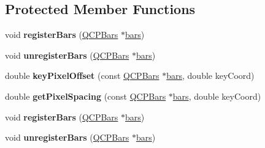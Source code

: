 \subsection*{Protected Member Functions}
\begin{DoxyCompactItemize}
\item 
void {\bfseries register\+Bars} (\hyperlink{class_q_c_p_bars}{Q\+C\+P\+Bars} $\ast$\hyperlink{class_q_c_p_bars_group_a7c72ed1f8cd962c93b8c42ab96cd91ec}{bars})\hypertarget{class_q_c_p_bars_group_a7b00514f19ad58d0bb3fd5246a67fae2}{}\label{class_q_c_p_bars_group_a7b00514f19ad58d0bb3fd5246a67fae2}

\item 
void {\bfseries unregister\+Bars} (\hyperlink{class_q_c_p_bars}{Q\+C\+P\+Bars} $\ast$\hyperlink{class_q_c_p_bars_group_a7c72ed1f8cd962c93b8c42ab96cd91ec}{bars})\hypertarget{class_q_c_p_bars_group_ac7073cdd7b1a40c6cb4b5f908145f8c4}{}\label{class_q_c_p_bars_group_ac7073cdd7b1a40c6cb4b5f908145f8c4}

\item 
double {\bfseries key\+Pixel\+Offset} (const \hyperlink{class_q_c_p_bars}{Q\+C\+P\+Bars} $\ast$\hyperlink{class_q_c_p_bars_group_a7c72ed1f8cd962c93b8c42ab96cd91ec}{bars}, double key\+Coord)\hypertarget{class_q_c_p_bars_group_a8e2ca6002e7bab49670144d048a2bcc9}{}\label{class_q_c_p_bars_group_a8e2ca6002e7bab49670144d048a2bcc9}

\item 
double {\bfseries get\+Pixel\+Spacing} (const \hyperlink{class_q_c_p_bars}{Q\+C\+P\+Bars} $\ast$\hyperlink{class_q_c_p_bars_group_a7c72ed1f8cd962c93b8c42ab96cd91ec}{bars}, double key\+Coord)\hypertarget{class_q_c_p_bars_group_a0beccd41bc3841a4c5b284823bc7d2de}{}\label{class_q_c_p_bars_group_a0beccd41bc3841a4c5b284823bc7d2de}

\item 
void {\bfseries register\+Bars} (\hyperlink{class_q_c_p_bars}{Q\+C\+P\+Bars} $\ast$\hyperlink{class_q_c_p_bars_group_a7c72ed1f8cd962c93b8c42ab96cd91ec}{bars})\hypertarget{class_q_c_p_bars_group_a7b00514f19ad58d0bb3fd5246a67fae2}{}\label{class_q_c_p_bars_group_a7b00514f19ad58d0bb3fd5246a67fae2}

\item 
void {\bfseries unregister\+Bars} (\hyperlink{class_q_c_p_bars}{Q\+C\+P\+Bars} $\ast$\hyperlink{class_q_c_p_bars_group_a7c72ed1f8cd962c93b8c42ab96cd91ec}{bars})\hypertarget{class_q_c_p_bars_group_ac7073cdd7b1a40c6cb4b5f908145f8c4}{}\label{class_q_c_p_bars_group_ac7073cdd7b1a40c6cb4b5f908145f8c4}


\end{DoxyCompactItemize}
